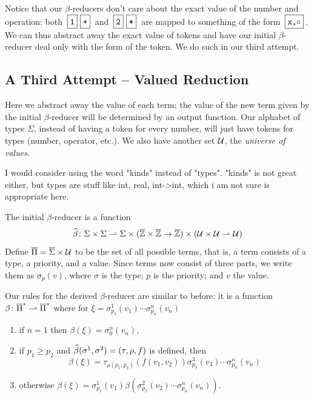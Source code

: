 \documentclass{llncs}
\newcommand{\yoni}[1]{{\begin{mdframed}[linecolor=red]{\color{red}#1}\end{mdframed}}}
\begin{document}
Notice that our $\beta$-reducers don't care about the exact value of the number and operation: both $\mbt1\mbt+$ and $\mbt2\mbt*$ are mapped to something of the form $\mbt{x,$\circ$}$.
We can thus abstract away the exact value of tokens and have our initial $\beta$-reducer deal only with the form of the token.
We do such in our third attempt.

\subsection{A Third Attempt -- Valued Reduction} \label{valued-reduction}

Here we abstract away the value of each term; the value of the new term given by the initial $\beta$-reducer will be determined by an output function.
Our alphabet of types $\Sigma$, instead of having a token for every number, will just have tokens for types (number, operator, etc.).
We also have another set $\mathcal U$, the \textit{universe of values}.

\yoni{I would consider using the word "kinds" instead of "types". "kinds" is not great either, but types are stuff like int, real, int->int, which i am not sure is appropriate here.}


The initial $\beta$-reducer is a function
\[ \widehat\beta \colon \Sigma\times\Sigma \rightharpoonup \Sigma\times(\overline{\mathbb Z}\times\overline{\mathbb Z}\to\overline{\mathbb Z})\times(\mathcal U\times\mathcal U\rightharpoonup\mathcal U) \]
Define $\overline\Pi=\overline\Sigma\times\mathcal U$ to be the set of all possible terms,
that is, 
a term consists of a type, a priority, and a value.
Since terms now consist of three parts, we write them as $\sigma_p(v)$, where $\sigma$ is the type; $p$ is the priority; and $v$ the value.

Our rules for the derived $\beta$-reducer are similar to before: it is a function $\beta\colon\overline\Pi^* \rightharpoonup \overline\Pi^*$ where for $\xi=\sigma^1_{p_1}(v_1)\cdots\sigma^n_{p_n}(v_n)$
\begin{enumerate}
    \item if $n=1$ then $\beta(\xi)=\sigma^n_0(v_n)$,
    \item if $p_1\geq p_2$ and $\widehat\beta(\sigma^1,\sigma^2)=(\tau,\rho,f)$ is defined, then
    \[ \beta(\xi)=\tau_{\rho(p_1,p_2)}(f(v_1,v_2))\sigma^3_{p_3}(v_3)\cdots\sigma^n_{p_n}(v_n) \]
    \item otherwise $\beta(\xi)=\sigma^1_{p_1}(v_1)\beta(\sigma^2_{p_2}(v_2)\cdots\sigma^n_{p_n}(v_n))$.
\end{enumerate}
\end{document}
